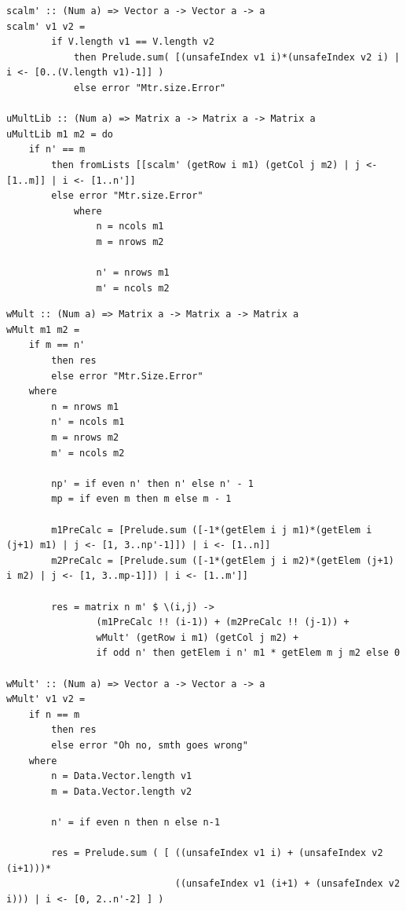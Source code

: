 \documentclass[12pt]{report}
\begin{document}
\begin{lstlisting}[label=some-code,caption=Стандартный алгоритм]
scalm' :: (Num a) => Vector a -> Vector a -> a
scalm' v1 v2 = 
        if V.length v1 == V.length v2
            then Prelude.sum( [(unsafeIndex v1 i)*(unsafeIndex v2 i) | i <- [0..(V.length v1)-1]] )
            else error "Mtr.size.Error"

uMultLib :: (Num a) => Matrix a -> Matrix a -> Matrix a
uMultLib m1 m2 = do
    if n' == m
        then fromLists [[scalm' (getRow i m1) (getCol j m2) | j <- [1..m]] | i <- [1..n']]
        else error "Mtr.size.Error"
            where 
                n = ncols m1
                m = nrows m2

                n' = nrows m1
                m' = ncols m2
\end{lstlisting}

\begin{lstlisting}[label=some-code,caption=Алгоритм Винограда]
wMult :: (Num a) => Matrix a -> Matrix a -> Matrix a
wMult m1 m2 = 
    if m == n'
        then res 
        else error "Mtr.Size.Error"
    where
        n = nrows m1
        n' = ncols m1
        m = nrows m2
        m' = ncols m2

        np' = if even n' then n' else n' - 1
        mp = if even m then m else m - 1

        m1PreCalc = [Prelude.sum ([-1*(getElem i j m1)*(getElem i (j+1) m1) | j <- [1, 3..np'-1]]) | i <- [1..n]]  
        m2PreCalc = [Prelude.sum ([-1*(getElem j i m2)*(getElem (j+1) i m2) | j <- [1, 3..mp-1]]) | i <- [1..m']]

        res = matrix n m' $ \(i,j) ->
                (m1PreCalc !! (i-1)) + (m2PreCalc !! (j-1)) +  
                wMult' (getRow i m1) (getCol j m2) + 
                if odd n' then getElem i n' m1 * getElem m j m2 else 0

wMult' :: (Num a) => Vector a -> Vector a -> a
wMult' v1 v2 = 
    if n == m
        then res
        else error "Oh no, smth goes wrong"
    where
        n = Data.Vector.length v1
        m = Data.Vector.length v2

        n' = if even n then n else n-1

        res = Prelude.sum ( [ ((unsafeIndex v1 i) + (unsafeIndex v2 (i+1)))*
                              ((unsafeIndex v1 (i+1) + (unsafeIndex v2 i))) | i <- [0, 2..n'-2] ] )
\end{lstlisting}
\end{document}
